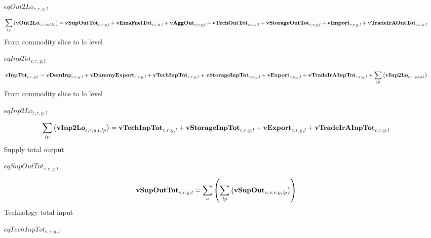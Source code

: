 \documentclass{article}
\begin{document}
$eqOut2Lo_{c,r,y,l}$





\begin{dmath} 
\sum_{lp}{\left({\bf vOut2Lo}_{c,r,y,l,lp}\right)}  =  {\bf vSupOutTot}_{c,r,y,l}+{\bf vEmsFuelTot}_{c,r,y,l}+{\bf vAggOut}_{c,r,y,l}+{\bf vTechOutTot}_{c,r,y,l}+{\bf vStorageOutTot}_{c,r,y,l}+{\bf vImport}_{c,r,y,l}+{\bf vTradeIrAOutTot}_{c,r,y,l}
\end{dmath} 
From commodity slice to lo level







$eqInpTot_{c,r,y,l}$





\begin{dmath} 
{\bf vInpTot}_{c,r,y,l}  =  {\bf vDemInp}_{c,r,y,l}+{\bf vDummyExport}_{c,r,y,l}+{\bf vTechInpTot}_{c,r,y,l}+{\bf vStorageInpTot}_{c,r,y,l}+{\bf vExport}_{c,r,y,l}+{\bf vTradeIrAInpTot}_{c,r,y,l}+\sum_{lp}{\left({\bf vInp2Lo}_{c,r,y,lp,l}\right)}
\end{dmath} 
From commodity slice to lo level







$eqInp2Lo_{c,r,y,l}$





\begin{dmath} 
\sum_{lp}{\left({\bf vInp2Lo}_{c,r,y,l,lp}\right)}  =  {\bf vTechInpTot}_{c,r,y,l}+{\bf vStorageInpTot}_{c,r,y,l}+{\bf vExport}_{c,r,y,l}+{\bf vTradeIrAInpTot}_{c,r,y,l}
\end{dmath} 
Supply total output







$eqSupOutTot_{c,r,y,l}$





\begin{dmath} 
{\bf vSupOutTot}_{c,r,y,l}  =  \sum_{u}{\left(\sum_{lp}{\left({\bf vSupOut}_{u,c,r,y,lp}\right)}\right)}
\end{dmath} 
Technology total input







$eqTechInpTot_{c,r,y,l}$
\end{document}
